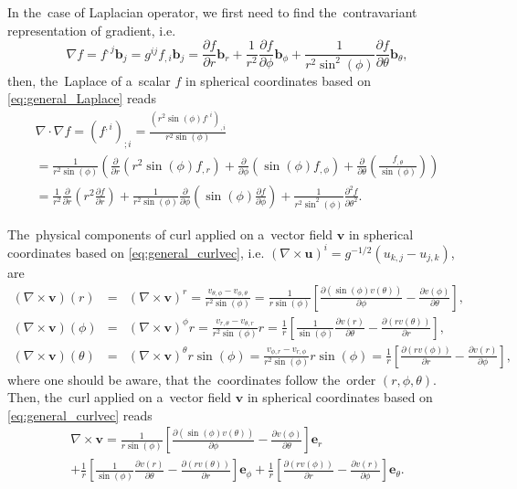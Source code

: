 \documentclass[preprint,12pt]{elsarticle}
\newcommand{\pdv}[2]{\frac{\partial{#1}}{\partial{#2}}}
\newcommand{\vect}[1]{\boldsymbol{#1}}
\newcounter{bla}
\begin{document}
In the~case of Laplacian operator, we first need to find the~contravariant 
representation of gradient, i.e.
\begin{equation}
  \nabla f = f^{,j}\vect{b}_j = g^{ij} f_{,i}\vect{b}_j 
  = \pdv{f}{r}\vect{b}_r + \frac{1}{r^2}\pdv{f}{\phi}\vect{b}_\phi
  + \frac{1}{r^2\sin^2(\phi)}\pdv{f}{\theta}\vect{b}_{\theta} ,
  \nonumber
\end{equation}
then, the~Laplace of a~scalar $f$ in spherical coordinates based on
\eqref{eq:general_Laplace} reads
\begin{multline}
  \nabla\cdot\nabla f = (f^{,i})_{;i} = 
  \frac{(r^2\sin(\phi)f^{,i})_{,i}}{r^2\sin(\phi)} \\
  = \frac{1}{r^2\sin(\phi)}\left( \pdv{}{r}\left(r^2\sin(\phi)f_{,r} \right) 
  + \pdv{}{\phi}\left(\sin(\phi) f_{,\phi} \right)
  + \pdv{}{\theta}\left(\frac{f_{,\theta}}{\sin(\phi)}\right) \right) \\
  = \frac{1}{r^2}\pdv{}{r}\left(r^2\pdv{f}{r} \right) 
  + \frac{1}{r^2\sin(\phi)} \pdv{}{\phi}\left(\sin(\phi) \pdv{f}{\phi}\right)
  + \frac{1}{r^2\sin^2(\phi)} \frac{\partial^2 f}{\partial\theta^2} .
  \label{eq:spher_Laplacef}
\end{multline}

The~physical components of curl applied on a~vector field $\vect{v}$ 
in spherical coordinates based on \eqref{eq:general_curlvec}, 
i.e. $(\nabla\times\vect{u})^i = g^{-1/2} (u_{k,j} - u_{j,k})$, are
\begin{eqnarray}
  (\nabla\times\vect{v})(r) &=& (\nabla\times\vect{v})^r 
  = \frac{v_{\theta,\phi} - v_{\phi,\theta}}{r^2\sin(\phi)} 
  = \frac{1}{r\sin(\phi)}
  \left[\pdv{(\sin(\phi)v(\theta))}{\phi} - \pdv{v(\phi)}{\theta} \right] , 
  \nonumber \\
  (\nabla\times\vect{v})(\phi) &=& (\nabla\times\vect{v})^\phi r 
  = \frac{v_{r,\theta} - v_{\theta,r}}{r^2\sin(\phi)} r  
  = \frac{1}{r}
  \left[\frac{1}{\sin(\phi)}\pdv{v(r)}{\theta} 
  - \pdv{(r v(\theta))}{r} \right] , 
  \nonumber \\
  (\nabla\times\vect{v})(\theta) &=& (\nabla\times\vect{v})^\theta r\sin(\phi) 
  = \frac{v_{\phi,r} - v_{r, \phi}}{r^2\sin(\phi)} r\sin(\phi) 
  = \frac{1}{r}
  \left[\pdv{(r v(\phi))}{r} 
  - \pdv{v(r)}{\phi} \right] , \nonumber
\end{eqnarray}
where one should be aware, that the~coordinates follow the~order 
$(r, \phi, \theta)$.
Then, the~curl applied on a~vector field $\vect{v}$ in spherical coordinates 
based on \eqref{eq:general_curlvec} reads
\begin{multline}
  \nabla\times\vect{v} = 
  \frac{1}{r\sin(\phi)}
  \left[\pdv{(\sin(\phi)v(\theta))}{\phi} - \pdv{v(\phi)}{\theta} \right] 
  \vect{e}_r\\
  + \frac{1}{r}
  \left[\frac{1}{\sin(\phi)}\pdv{v(r)}{\theta} 
  - \pdv{(r v(\theta))}{r} \right]
  \vect{e}_\phi
  + \frac{1}{r}
  \left[\pdv{(r v(\phi))}{r} 
  - \pdv{v(r)}{\phi} \right] 
  \vect{e}_\theta .
  \label{eq:spher_curlvec}
\end{multline}
\end{document}
